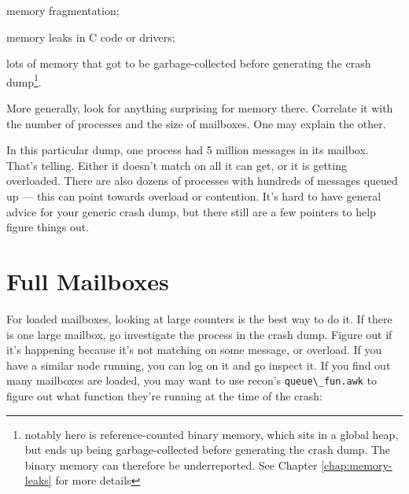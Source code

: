 \documentclass[11pt, oneside]{book}   	%
\newcommand{\app}[1]{\Verb`#1`}
\begin{document}
\begin{itemize*}
	\item memory fragmentation;
	\item memory leaks in C code or drivers;
	\item lots of memory that got to be garbage-collected before generating the crash dump\footnote{notably here is reference-counted binary memory, which sits in a global heap, but ends up being garbage-collected before generating the crash dump. The binary memory can therefore be underreported. See Chapter \ref{chap:memory-leaks} for more details}.
\end{itemize*}

More generally, look for anything surprising for memory there. Correlate it with the number of processes and the size of mailboxes. One may explain the other. 

In this particular dump, one process had 5 million messages in its mailbox. That's telling. Either it doesn't match on all it can get, or it is getting overloaded. There are also dozens of processes with hundreds of messages queued up — this can point towards overload or contention. It's hard to have general advice for your generic crash dump, but there still are a few pointers to help figure things out.

\section{Full Mailboxes}
\label{sec:crash-full-mailboxes}

For loaded mailboxes, looking at large counters is the best way to do it. If there is one large mailbox, go investigate the process in the crash dump. Figure out if it's happening because it's not matching on some message, or overload. If you have a similar node running, you can log on it and go inspect it. If you find out many mailboxes are loaded, you may want to use recon's \app{queue\_fun.awk} to figure out what function they're running at the time of the crash:

\end{document}

